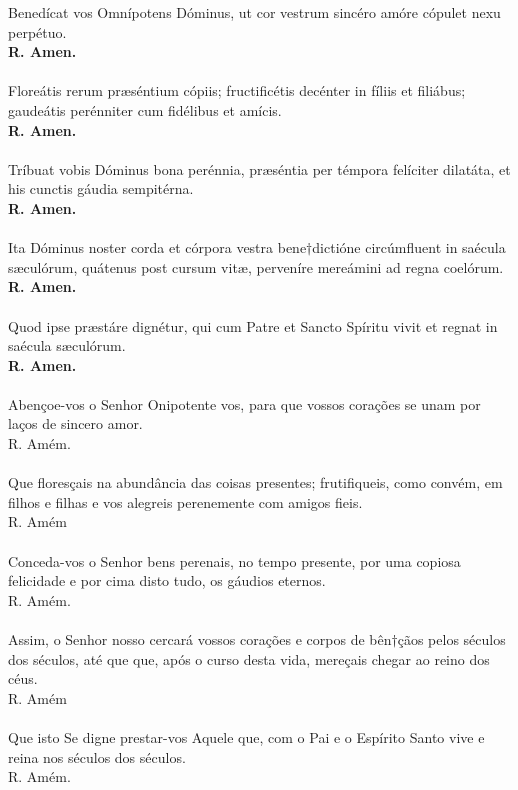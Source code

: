 \begin{multicols}{2}
\noindent Benedícat vos Omnípotens Dóminus, ut cor vestrum sincéro amóre cópulet nexu perpétuo.
\\ \textbf{R. Amen.}
\\
\\ Floreátis rerum præséntium cópiis;  fructificétis decénter in fíliis et filiábus; gaudeátis perénniter cum fidélibus et amícis.
\\ \textbf{R. Amen.}
\\
\\ Tríbuat vobis Dóminus bona perénnia, præséntia per témpora felíciter dilatáta, et his cunctis gáudia sempitérna.
\\ \textbf{R. Amen.}
\\ 
\\ Ita Dóminus noster corda et córpora vestra bene$\dagger$dictióne circúmfluent in saécula sæculórum, quátenus post cursum vitæ, perveníre mereámini ad regna coelórum.
\\ \textbf{R. Amen.}
\\
\\Quod ipse præstáre dignétur, qui cum Patre et Sancto Spíritu vivit et regnat in saécula sæculórum.
\\ \textbf{R. Amen.}
\\
\\ Abençoe-vos o Senhor Onipotente vos, para que vossos corações se unam por laços de sincero amor. 
\\ R. Amém.
\\
\\ Que floresçais na abundância das coisas presentes; frutifiqueis, como convém, em filhos e filhas e vos alegreis perenemente com amigos fieis.
\\ R. Amém
\\
\\ Conceda-vos o Senhor bens perenais, no tempo presente, por uma copiosa felicidade e por cima disto tudo, os gáudios eternos.
\\R. Amém.
\\
\\Assim, o Senhor nosso cercará vossos corações e corpos de bên$\dagger$çãos pelos séculos dos séculos, até que que, após o curso desta vida, mereçais chegar ao reino dos céus.
\\R. Amém
\\
\\Que isto Se digne prestar-vos Aquele que, com o Pai e o Espírito Santo vive e reina nos séculos dos séculos.
\\R. Amém.
\end{multicols}
